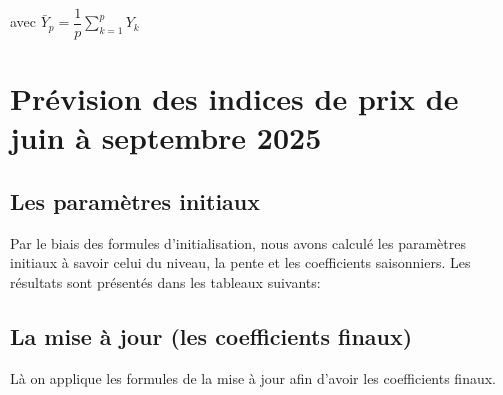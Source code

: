 \documentclass[
12pt,          %
a4paper,       %
oneside,       %
openright      %
]{report}
\begin{document}
 avec $\bar{Y}_p = \dfrac{1}{p} \displaystyle\sum_{k=1}^{p} Y_k$
 
  
 \section{ Prévision des indices de prix de juin à septembre 2025}
 
 \subsection{ Les paramètres initiaux}
 
 Par le biais des formules d'initialisation, nous avons calculé les paramètres initiaux à savoir celui du niveau, la pente et les coefficients saisonniers. Les résultats sont présentés dans les tableaux suivants: 
 
 
 \begin{table}[H]
 	\centering
 	
 	\caption{Paramètres initiaux (le niveau et la pente) (année 2015) --- Lissage HOLT-WINTERS}
 	\label{tab:params_initiaux}
 \end{table}
 
 \begin{table}[H]
 	\centering
 	
 	\caption{Coefficients saisonniers initiaux (année 2015) --- Lissage HOLT-WINTERS}
 	\label{tab:tab:coeff_saisonniers_init}
 \end{table}
 
 
 \subsection{La mise à jour (les coefficients finaux)}
 
 Là on applique les formules de la mise à jour afin d'avoir les coefficients finaux. 
 
 \begin{table}[H]
 	\centering
 	
 	\caption{Paramètres finaux --- Lissage HOLT-WINTERS}
 	\label{tab: params_finaux}
 \end{table}
 
 \begin{table}[H]
 	\centering
 	
 	\caption{Coefficients saisonniers finaux --- Lissage HOLT-WINTERS}
 	\label{tab:coeff_saisonniers_finaux}
 \end{table}
 
 
 
\end{document}
